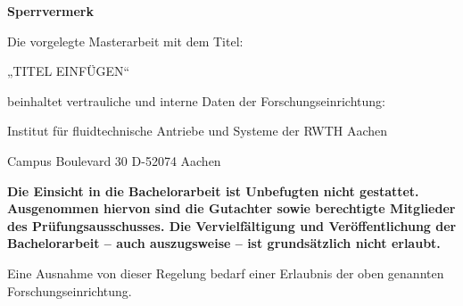 \begin{center}
	\textbf{Sperrvermerk}
\end{center}
\raggedright
Die vorgelegte Masterarbeit mit dem Titel:

„TITEL EINFÜGEN“

beinhaltet vertrauliche und interne Daten der Forschungseinrichtung:

Institut für fluidtechnische Antriebe und Systeme der RWTH Aachen

Campus Boulevard 30 D-52074 Aachen

\textbf{Die Einsicht in die Bachelorarbeit ist Unbefugten nicht gestattet. Ausgenommen hiervon sind die Gutachter sowie berechtigte Mitglieder des Prüfungsausschusses. Die Vervielfältigung und Veröffentlichung der Bachelorarbeit – auch auszugsweise – ist grundsätzlich nicht erlaubt.}

Eine Ausnahme von dieser Regelung bedarf einer Erlaubnis der oben genannten Forschungseinrichtung.

\clearpage